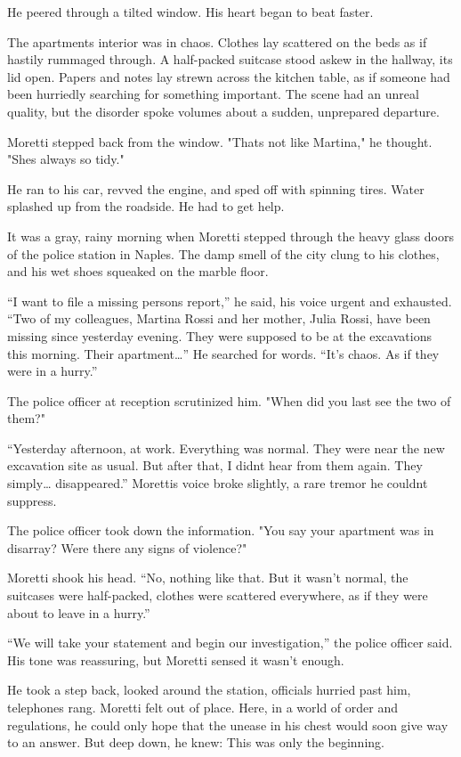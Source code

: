 \documentclass[
]{article}
\begin{document}
He peered through a tilted window. His heart began to beat faster.

The apartment\textquotesingle s interior was in chaos. Clothes lay scattered on the beds as if hastily rummaged through. A half-packed suitcase stood askew in the hallway, its lid open. Papers and notes lay strewn across the kitchen table, as if someone had been hurriedly searching for something important. The scene had an unreal quality, but the disorder spoke volumes about a sudden, unprepared departure.

Moretti stepped back from the window. "That\textquotesingle s not like Martina," he thought. "She\textquotesingle s always so tidy."

He ran to his car, revved the engine, and sped off with spinning tires. Water splashed up from the roadside. He had to get help.

It was a gray, rainy morning when Moretti stepped through the heavy glass doors of the police station in Naples. The damp smell of the city clung to his clothes, and his wet shoes squeaked on the marble floor.

``I want to file a missing persons report,'' he said, his voice urgent and exhausted. ``Two of my colleagues, Martina Rossi and her mother, Julia Rossi, have been missing since yesterday evening. They were supposed to be at the excavations this morning. Their apartment\ldots'' He searched for words. ``It's chaos. As if they were in a hurry.''

The police officer at reception scrutinized him. "When did you last see the two of them?"

``Yesterday afternoon, at work. Everything was normal. They were near the new excavation site as usual. But after that, I didn\textquotesingle t hear from them again. They simply\ldots{} disappeared.'' Moretti\textquotesingle s voice broke slightly, a rare tremor he couldn\textquotesingle t suppress.

The police officer took down the information. "You say your apartment was in disarray? Were there any signs of violence?"

Moretti shook his head. ``No, nothing like that. But it wasn't normal, the suitcases were half-packed, clothes were scattered everywhere, as if they were about to leave in a hurry.''

``We will take your statement and begin our investigation,'' the police officer said. His tone was reassuring, but Moretti sensed it wasn't enough.

He took a step back, looked around the station, officials hurried past him, telephones rang. Moretti felt out of place. Here, in a world of order and regulations, he could only hope that the unease in his chest would soon give way to an answer. But deep down, he knew: This was only the beginning.
\end{document}
